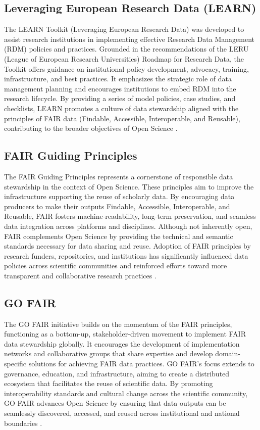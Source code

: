 \documentclass[final]{rc-book-2.14}
\begin{document}
\subsection{Leveraging European Research Data (LEARN)}
The LEARN Toolkit (Leveraging European Research Data) was developed to assist research institutions in implementing effective Research Data Management (RDM) policies and practices. Grounded in the recommendations of the LERU (League of European Research Universities) Roadmap for Research Data, the Toolkit offers guidance on institutional policy development, advocacy, training, infrastructure, and best practices. It emphasizes the strategic role of data management planning and encourages institutions to embed RDM into the research lifecycle. By providing a series of model policies, case studies, and checklists, LEARN promotes a culture of data stewardship aligned with the principles of FAIR data (Findable, Accessible, Interoperable, and Reusable), contributing to the broader objectives of Open Science \cite{learn_2017}.

\subsection{FAIR Guiding Principles}
The FAIR Guiding Principles represents a cornerstone of responsible data stewardship in the context of Open Science. These principles aim to improve the infrastructure supporting the reuse of scholarly data. By encouraging data producers to make their outputs Findable, Accessible, Interoperable, and Reusable, FAIR fosters machine-readability, long-term preservation, and seamless data integration across platforms and disciplines. Although not inherently open, FAIR complements Open Science by providing the technical and semantic standards necessary for data sharing and reuse. Adoption of FAIR principles by research funders, repositories, and institutions has significantly influenced data policies across scientific communities and reinforced efforts toward more transparent and collaborative research practices \cite{wilkinson_fair_2016}.


\subsection{GO FAIR}
The GO FAIR initiative builds on the momentum of the FAIR principles, functioning as a bottom-up, stakeholder-driven movement to implement FAIR data stewardship globally. It encourages the development of implementation networks and collaborative groups that share expertise and develop domain-specific solutions for achieving FAIR data practices. GO FAIR’s focus extends to governance, education, and infrastructure, aiming to create a distributed ecosystem that facilitates the reuse of scientific data. By promoting interoperability standards and cultural change across the scientific community, GO FAIR advances Open Science by ensuring that data outputs can be seamlessly discovered, accessed, and reused across institutional and national boundaries \cite{henning_go_2019}.
\end{document}

